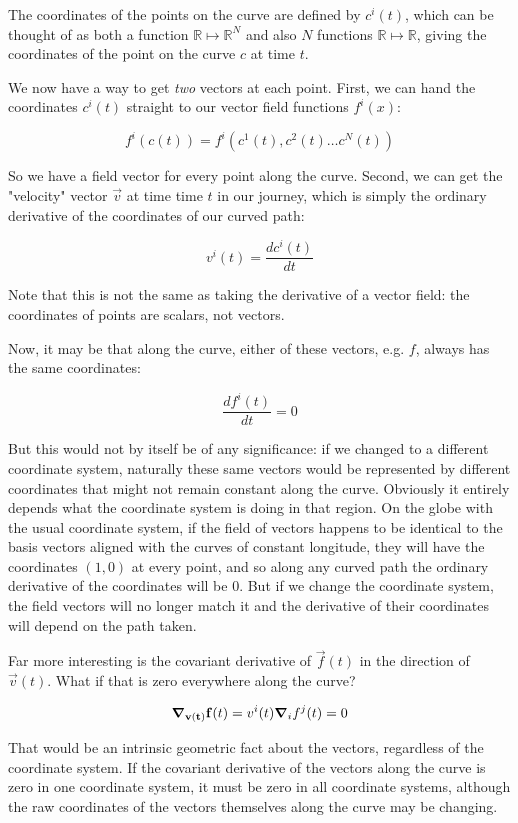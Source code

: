 The coordinates of the points on the curve are defined by $c^i(t)$, which can be thought of as both a function $\mathbb{R} \mapsto \mathbb{R}^N$ and also $N$ functions $\mathbb{R} \mapsto \mathbb{R}$, giving the coordinates of the point on the curve $c$ at time $t$.

We now have a way to get \textit{two} vectors at each point. First, we can hand the coordinates $c^i(t)$ straight to our vector field functions $f^i(x)$:

$$
f^i(c(t)) = f^i(c^1(t), c^2(t) \dots c^N(t))
$$

So we have a field vector for every point along the curve. Second, we can get the "velocity" vector $\vec{v}$ at time time $t$ in our journey, which is simply the ordinary derivative of the coordinates of our curved path:

$$
v^i(t) = \frac{d c^i(t)}{dt}
$$

Note that this is not the same as taking the derivative of a vector field: the coordinates of points are scalars, not vectors.

Now, it may be that along the curve, either of these vectors, e.g. $f$, always has the same coordinates:

$$
\frac{d f^i(t)}{dt} = 0
$$

But this would not by itself be of any significance: if we changed to a different coordinate system, naturally these same vectors would be represented by different coordinates that might not remain constant along the curve. Obviously it entirely depends what the coordinate system is doing in that region. On the globe with the usual coordinate system, if the field of vectors happens to be identical to the basis vectors aligned with the curves of constant longitude, they will have the coordinates $(1, 0)$ at every point, and so along any curved path the ordinary derivative of the coordinates will be $0$. But if we change the coordinate system, the field vectors will no longer match it and the derivative of their coordinates will depend on the path taken.

Far more interesting is the covariant derivative of $\vec{f}(t)$ in the direction of $\vec{v}(t)$. What if that is zero everywhere along the curve?

$$
\grad_{\mathbf{v(t)}} \mathbf{f}(t)
=
v^i(t) \grad_i f^j(t) = 0
$$

That would be an intrinsic geometric fact about the vectors, regardless of the coordinate system. If the covariant derivative of the vectors along the curve is zero in one coordinate system, it must be zero in all coordinate systems, although the raw coordinates of the vectors themselves along the curve may be changing.

